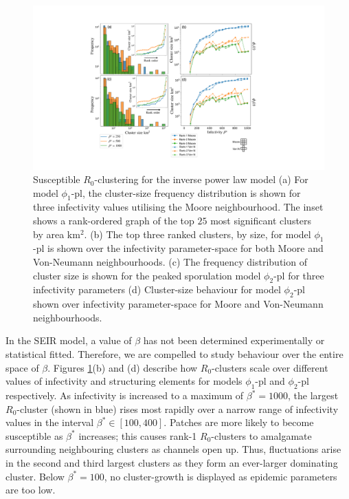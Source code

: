 \begin{figure}
    \centering
    \includegraphics[scale=0.45]{chapter6/figures/fig6-pl-cluster-distribution.pdf}
    \caption{Susceptible $R_0$-clustering for the inverse power law model (a) For model $\phi_1$-pl, the cluster-size frequency distribution is shown for three infectivity values utilising the Moore neighbourhood. The inset shows a rank-ordered graph of the top $25$ most significant clusters by area $\mathrm{km^2}$. (b) The top three ranked clusters, by size, for model $\phi_1$-pl is shown over the infectivity parameter-space for both Moore and Von-Neumann neighbourhoods. (c) The frequency distribution of cluster size is shown for the peaked sporulation model $\phi_2$-pl for three infectivity parameters (d) Cluster-size behaviour for model $\phi_2$-pl shown over infectivity parameter-space for Moore and Von-Neumann neighbourhoods.}
    \label{fig:inverse-power-law-clustering}
\end{figure}

In the SEIR model, a value of $\beta$ has not been determined experimentally or statistical fitted.
Therefore, we are compelled to study behaviour over the entire space of $\beta$.
Figures \ref{fig:inverse-power-law-clustering}(b) and (d) describe how $R_0$-clusters scale over different values of infectivity and structuring elements for models $\phi_1$-pl and $\phi_2$-pl respectively.
As infectivity is increased to a maximum of $\beta^*=1000$, the largest $R_0$-cluster (shown in blue) rises most rapidly over a narrow range of infectivity values in the interval $\beta^*\in [100, 400]$.
Patches are more likely to become susceptible as $\beta^*$ increases; this causes rank-1 $R_0$-clusters to amalgamate surrounding neighbouring clusters as channels open up.
Thus, fluctuations arise in the second and third largest clusters as they form an ever-larger dominating cluster.
Below $\beta^*=100$, no cluster-growth is displayed as epidemic parameters are too low. 
 
